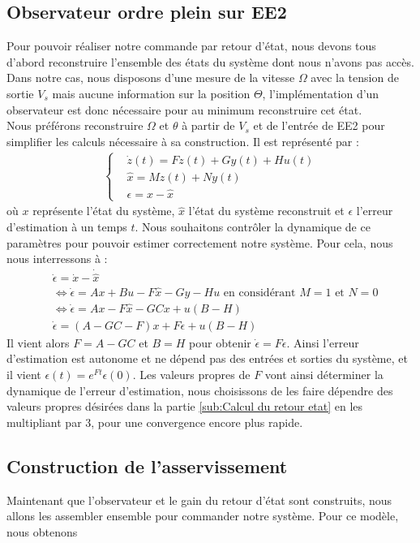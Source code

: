 \subsection{Observateur ordre plein sur EE2}
Pour pouvoir réaliser notre commande par retour d'état, nous devons tous d'abord reconstruire l'ensemble des états du système dont nous n'avons pas accès. Dans notre cas, nous disposons d'une mesure de la vitesse $\Omega$ avec la tension de sortie $V_s$ mais aucune information sur la position $\Theta$, l'implémentation d'un observateur est donc nécessaire pour au minimum reconstruire cet état.\\
Nous préférons reconstruire $\Omega$ et $\theta$ à partir de $V_s$ et de l'entrée de EE2 pour simplifier les calculs nécessaire à sa construction. Il est représenté par :
\begin{align*}
\left\lbrace
\begin{aligned}
&\dot z (t) = Fz(t) + Gy(t) + Hu(t)\\
&\hat x = Mz(t) + Ny(t)\\
&\epsilon = x-\hat{x}
\end{aligned}
\right.
\end{align*} où $x$ représente l'état du système, $\hat{x}$ l'état du système reconstruit et $\epsilon$ l'erreur d'estimation à un temps $t$. Nous souhaitons contrôler la dynamique de ce paramètres pour pouvoir estimer correctement notre système. Pour cela, nous nous interressons à : \begin{align*}
&\dot{\epsilon} = \dot{x} - \dot{\hat{x}}\\
&\Leftrightarrow \dot{\epsilon} = Ax +Bu - F\hat{x} - Gy - Hu 
\text{   en considérant }M=1 \text{ et } N = 0\\
& \Leftrightarrow \dot{\epsilon} = Ax - F\hat{x} - GCx + u(B-H)\\
& \dot{\epsilon} = (A-GC-F)x + F\epsilon + u(B-H)
\end{align*} 
Il vient alors $F = A-GC$ et $B=H$ pour obtenir $\dot{\epsilon} = F\epsilon$. Ainsi l'erreur d'estimation est autonome et ne dépend pas des entrées et sorties du système, et il vient $\epsilon(t) = e^{Ft}\epsilon(0)$. Les valeurs propres de $F$ vont ainsi déterminer la dynamique de l'erreur d'estimation, nous choisissons de les faire dépendre des valeurs propres désirées dans la partie \ref{sub:Calcul du retour etat} en les multipliant par 3, pour une convergence encore plus rapide. 

\subsection{Construction de l'asservissement}
Maintenant que l'observateur et le gain du retour d'état sont construits, nous allons les assembler ensemble pour commander notre système. Pour ce modèle, nous obtenons 

